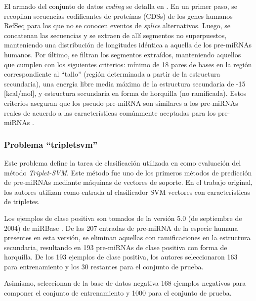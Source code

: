 \documentclass[12pt,bibliography=oldstyle,DIV=12,parskip=half-]{scrreprt}
\newcommand{\e}{\emph}
\begin{document}
El armado del conjunto de datos \e{coding} se detalla en
\cite{xue}. En un primer paso, se recopilan secuencias codificantes de
proteínas (CDSs) de los genes humanos RefSeq \cite{CITA} para los que
no se conocen eventos de \e{splice} alternativos.  Luego, se
concatenan las secuencias y se extraen de allí segmentos no
superpuestos, manteniendo una distribución de longitudes idéntica a
aquella de los pre-miRNAs humanos.  Por último, se filtran los
segmentos extraídos, manteniendo aquellos que cumplen con los
siguientes criterios: mínimo de 18 pares de bases en la región
correspondiente al ``tallo'' (región determinada a partir de la
estructura secundaria), una energía libre media máxima de la
estructura secundaria de -15 [kcal/mol], y estructura secundaria en
forma de horquilla (no ramificada).  Estos criterios aseguran que los
pseudo pre-miRNA son similares a los pre-miRNAs reales de acuerdo a
las características comúnmente aceptadas para los pre-miRNAs
\cite{xue}.
%
%
\subsubsection{Problema ``tripletsvm''}
%
Este problema define la tarea de clasificación utilizada en \cite{xue}
como evaluación del método \e{Triplet-SVM}.  Este método fue uno de
los primeros métodos de predicción de pre-miRNAs mediante máquinas de
vectores de soporte.  En el trabajo original, los autores utilizan
como entrada al clasificador SVM vectores con características de
tripletes.

Los ejemplos de clase positiva son tomados de la versión 5.0 (de
septiembre de 2004) de miRBase \cite{mirbase1,
  mirbase2, mirbase3}. De las 207 entradas de pre-miRNA de la especie
humana presentes en esta versión, se eliminan aquellas con
ramificaciones en la estructura secundaria, resultando en 193
pre-miRNAs de clase positiva con forma de horquilla.
De los 193 ejemplos de clase positiva, los autores seleccionaron 163
para entrenamiento y los 30 restantes para el conjunto de prueba.

Asimismo, seleccionan de la base de datos negativa  168
ejemplos negativos para componer el conjunto de entrenamiento y 1000
para el conjunto de prueba.
\end{document}
